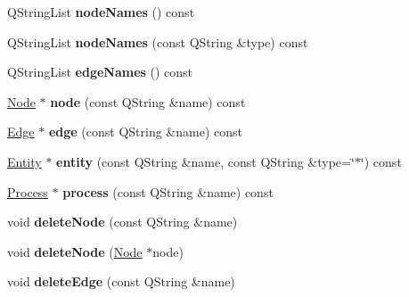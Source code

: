 \begin{DoxyCompactItemize}
\item 
\mbox{\label{class_graph_widget_ad03328de00095afcb1d7ce563067f3e4}} 
Q\+String\+List {\bfseries node\+Names} () const
\item 
\mbox{\label{class_graph_widget_a76817fe57531c137ce2af29a43c3e2b3}} 
Q\+String\+List {\bfseries node\+Names} (const Q\+String \&type) const
\item 
\mbox{\label{class_graph_widget_a8492634bc8057e97a8ff8b52eab1c547}} 
Q\+String\+List {\bfseries edge\+Names} () const
\item 
\mbox{\label{class_graph_widget_a6f58b0ec8a1612229dc9d1ad9689b86b}} 
\hyperlink{class_node}{Node} $\ast$ {\bfseries node} (const Q\+String \&name) const
\item 
\mbox{\label{class_graph_widget_a469639e439e97fcf000c261c80464dbc}} 
\hyperlink{class_edge}{Edge} $\ast$ {\bfseries edge} (const Q\+String \&name) const
\item 
\mbox{\label{class_graph_widget_a7b421e34e1442c32ad90dc11ec5e42ae}} 
\hyperlink{class_entity}{Entity} $\ast$ {\bfseries entity} (const Q\+String \&name, const Q\+String \&type=\char`\"{}$\ast$\char`\"{}) const
\item 
\mbox{\label{class_graph_widget_a63ab5e098336d4703fc45ef4e67c08d2}} 
\hyperlink{class_process}{Process} $\ast$ {\bfseries process} (const Q\+String \&name) const
\item 
\mbox{\label{class_graph_widget_a3981dd84b826ad1a64abb6ce41a8a06b}} 
void {\bfseries delete\+Node} (const Q\+String \&name)
\item 
\mbox{\label{class_graph_widget_a467ef6a7cb8e175618c948a13487f3c7}} 
void {\bfseries delete\+Node} (\hyperlink{class_node}{Node} $\ast$node)
\item 
\mbox{\label{class_graph_widget_ae54dfe1c6719e49838d4f8b5174964ab}} 
void {\bfseries delete\+Edge} (const Q\+String \&name)
\item 

\end{DoxyCompactItemize}

